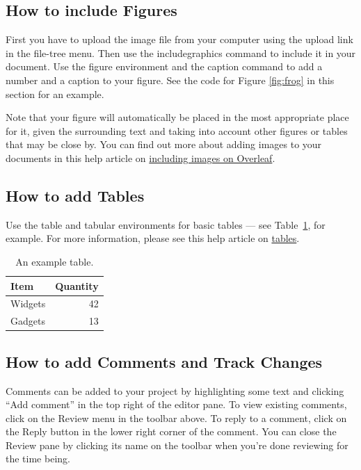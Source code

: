 \documentclass{article}
\begin{document}
\subsection{How to include Figures}

First you have to upload the image file from your computer using the upload link in the file-tree menu. Then use the includegraphics command to include it in your document. Use the figure environment and the caption command to add a number and a caption to your figure. See the code for Figure \ref{fig:frog} in this section for an example.

Note that your figure will automatically be placed in the most appropriate place for it, given the surrounding text and taking into account other figures or tables that may be close by. You can find out more about adding images to your documents in this help article on \href{https://www.overleaf.com/learn/how-to/Including_images_on_Overleaf}{including images on Overleaf}.


\subsection{How to add Tables}

Use the table and tabular environments for basic tables --- see Table~\ref{tab:widgets}, for example. For more information, please see this help article on \href{https://www.overleaf.com/learn/latex/tables}{tables}. 

\begin{table}
\centering
\begin{tabular}{l|r}
Item & Quantity \\\hline
Widgets & 42 \\
Gadgets & 13
\end{tabular}
\caption{\label{tab:widgets}An example table.}
\end{table}

\subsection{How to add Comments and Track Changes}

Comments can be added to your project by highlighting some text and clicking ``Add comment'' in the top right of the editor pane. To view existing comments, click on the Review menu in the toolbar above. To reply to a comment, click on the Reply button in the lower right corner of the comment. You can close the Review pane by clicking its name on the toolbar when you're done reviewing for the time being.
\end{document}
